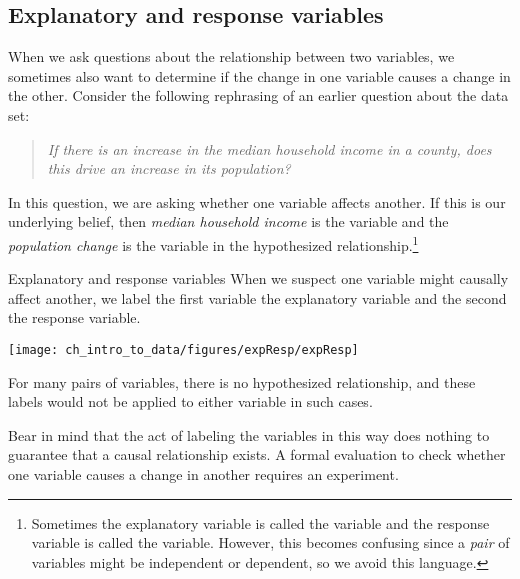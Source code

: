 \D{\newpage}

\subsection{Explanatory and response variables}
\label{explanatoryAndResponse}

When we ask questions about the relationship
between two variables, we sometimes also want to determine
if the change in one variable causes a change in the other.
Consider the following rephrasing of an earlier question
about the  data set:
\begin{quote}\em
  If there is an increase in the median household income
  in a county, does this drive an increase in its population?
\end{quote}
In this question, we are asking whether one variable
affects another.
If this is our underlying belief,
then \emph{median household income} is the
variable and the \emph{population change} is the
 variable
in the hypothesized relationship.\footnote{Sometimes
  the explanatory variable is called the 
  variable and the response variable is called the
   variable.
  However, this becomes confusing since a \emph{pair}
  of variables might be independent or dependent,
  so we avoid this language.}


\begin{onebox}{Explanatory and response variables}
When we suspect one variable might causally affect another,
we label the first variable the explanatory variable and the
second the response variable.
\vspace{1mm}

\hspace{10mm}\texttt{[image: ch\_intro\_to\_data/figures/expResp/expResp]}

For many pairs of variables, there is no hypothesized
relationship, and these labels would not be applied to
either variable in such cases.
\end{onebox}

Bear in mind that the act of labeling the variables in this
way does nothing to guarantee that a causal relationship exists.
A formal evaluation to check whether one variable causes
a change in another requires an experiment.

